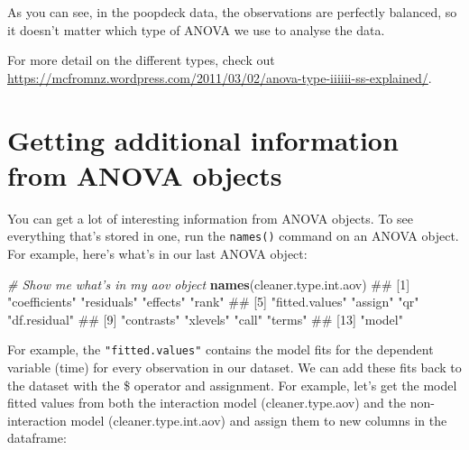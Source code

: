 \documentclass[]{book}
\newenvironment{Shaded}{\begin{snugshade}}{\end{snugshade}}
\newcommand{\KeywordTok}[1]{\textcolor[rgb]{0.13,0.29,0.53}{\textbf{#1}}}
\newcommand{\StringTok}[1]{\textcolor[rgb]{0.31,0.60,0.02}{#1}}
\newcommand{\CommentTok}[1]{\textcolor[rgb]{0.56,0.35,0.01}{\textit{#1}}}
\newcommand{\OperatorTok}[1]{\textcolor[rgb]{0.81,0.36,0.00}{\textbf{#1}}}
\newcommand{\NormalTok}[1]{#1}
\theoremstyle{definition}
\theoremstyle{definition}
\theoremstyle{remark}
\begin{document}
As you can see, in the poopdeck data, the observations are perfectly
balanced, so it doesn't matter which type of ANOVA we use to analyse the
data.

For more detail on the different types, check out
\url{https://mcfromnz.wordpress.com/2011/03/02/anova-type-iiiiii-ss-explained/}.

\section{Getting additional information from ANOVA
objects}\label{getting-additional-information-from-anova-objects}

You can get a lot of interesting information from ANOVA objects. To see
everything that's stored in one, run the \texttt{names()} command on an
ANOVA object. For example, here's what's in our last ANOVA object:

\begin{Shaded}
\begin{Highlighting}[]
\CommentTok{# Show me what's in my aov object}
\KeywordTok{names}\NormalTok{(cleaner.type.int.aov)}
\NormalTok{##  [1] "coefficients"  "residuals"     "effects"       "rank"         }
\NormalTok{##  [5] "fitted.values" "assign"        "qr"            "df.residual"  }
\NormalTok{##  [9] "contrasts"     "xlevels"       "call"          "terms"        }
\NormalTok{## [13] "model"}
\end{Highlighting}
\end{Shaded}

For example, the \texttt{"fitted.values"} contains the model fits for
the dependent variable (time) for every observation in our dataset. We
can add these fits back to the dataset with the \$ operator and
assignment. For example, let's get the model fitted values from both the
interaction model (cleaner.type.aov) and the non-interaction model
(cleaner.type.int.aov) and assign them to new columns in the dataframe:

\begin{Shaded}
\end{Shaded}
\end{document}
